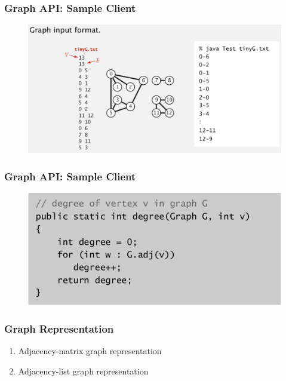 \documentclass[11pt]{beamer}
\begin{document}
\begin{frame}
	\frametitle	{Graph API: Sample Client} 
    \begin{figure}
    	\centering
    	\includegraphics[width=1.05\linewidth]{"Screenshot 2020-11-30 at 9.55.24 PM"}
    	\label{fig:screenshot-2020-11-30-at-9}
    \end{figure}   
\end{frame}

\begin{frame}
	\frametitle	{Graph API: Sample Client} 
	\begin{figure}
		\centering
		\includegraphics[width=1\linewidth]{"Screenshot 2020-11-30 at 9.59.34 PM"}
		\label{fig:screenshot-2020-11-30-at-9}
	\end{figure}	
\end{frame}

\begin{frame}
	\frametitle	{Graph Representation} 
	\begin{enumerate}
		\item Adjacency-matrix graph representation
		\item Adjacency-list graph representation
	\end{enumerate}
\end{frame}
\end{document}
